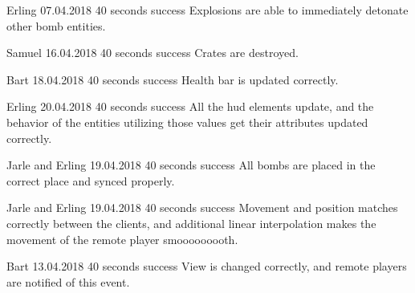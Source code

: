 {Erling}
{07.04.2018}
{40 seconds}
{success}
{Explosions are able to immediately detonate other bomb entities.}

{Samuel}
{16.04.2018}
{40 seconds}
{success}
{Crates are destroyed.}

{Bart}
{18.04.2018}
{40 seconds}
{success}
{Health bar is updated correctly.}

{Erling}
{20.04.2018}
{40 seconds}
{success}
{All the \gls{hud} elements update, and the behavior of the entities utilizing those values get their attributes updated correctly.}

{Jarle and Erling}
{19.04.2018}
{40 seconds}
{success}
{All bombs are placed in the correct place and synced properly.}

{Jarle and Erling}
{19.04.2018}
{40 seconds}
{success}
{Movement and position matches correctly between the clients, and additional linear interpolation makes the movement of the remote player smooooooooth.}

{Bart}
{13.04.2018}
{40 seconds}
{success}
{View is changed correctly, and remote players are notified of this event.}
